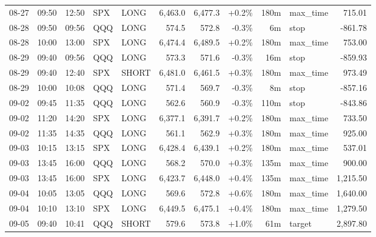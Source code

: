 \documentclass[11pt,a4paper,twoside]{article}
\begin{document}
\begin{center}
\begin{longtable}{>{\color{txtmain}}l l l l l r r r r >{\color{txtmain}}l r}
08-27 & 09:50 & 12:50 & SPX & LONG & 6,463.0 & 6,477.3 & \textcolor{wingreen}{+0.2\%} & 180m & max\_time & \textcolor{wingreen}{715.01} \\
08-28 & 09:50 & 09:56 & QQQ & LONG & 574.5 & 572.8 & \textcolor{lossred}{-0.3\%} & 6m & stop & \textcolor{lossred}{-861.78} \\
08-28 & 10:00 & 13:00 & SPX & LONG & 6,474.4 & 6,489.5 & \textcolor{wingreen}{+0.2\%} & 180m & max\_time & \textcolor{wingreen}{753.00} \\
08-29 & 09:40 & 09:56 & QQQ & LONG & 573.3 & 571.6 & \textcolor{lossred}{-0.3\%} & 16m & stop & \textcolor{lossred}{-859.93} \\
08-29 & 09:40 & 12:40 & SPX & SHORT & 6,481.0 & 6,461.5 & \textcolor{wingreen}{+0.3\%} & 180m & max\_time & \textcolor{wingreen}{973.49} \\
08-29 & 10:00 & 10:08 & QQQ & LONG & 571.4 & 569.7 & \textcolor{lossred}{-0.3\%} & 8m & stop & \textcolor{lossred}{-857.16} \\
09-02 & 09:45 & 11:35 & QQQ & LONG & 562.6 & 560.9 & \textcolor{lossred}{-0.3\%} & 110m & stop & \textcolor{lossred}{-843.86} \\
09-02 & 11:20 & 14:20 & SPX & LONG & 6,377.1 & 6,391.7 & \textcolor{wingreen}{+0.2\%} & 180m & max\_time & \textcolor{wingreen}{733.50} \\
09-02 & 11:35 & 14:35 & QQQ & LONG & 561.1 & 562.9 & \textcolor{wingreen}{+0.3\%} & 180m & max\_time & \textcolor{wingreen}{925.00} \\
09-03 & 10:15 & 13:15 & SPX & LONG & 6,428.4 & 6,439.1 & \textcolor{wingreen}{+0.2\%} & 180m & max\_time & \textcolor{wingreen}{537.01} \\
09-03 & 13:45 & 16:00 & QQQ & LONG & 568.2 & 570.0 & \textcolor{wingreen}{+0.3\%} & 135m & max\_time & \textcolor{wingreen}{900.00} \\
09-03 & 13:45 & 16:00 & SPX & LONG & 6,423.7 & 6,448.0 & \textcolor{wingreen}{+0.4\%} & 135m & max\_time & \textcolor{wingreen}{1,215.50} \\
09-04 & 10:05 & 13:05 & QQQ & LONG & 569.6 & 572.8 & \textcolor{wingreen}{+0.6\%} & 180m & max\_time & \textcolor{wingreen}{1,640.00} \\
09-04 & 10:10 & 13:10 & SPX & LONG & 6,449.5 & 6,475.1 & \textcolor{wingreen}{+0.4\%} & 180m & max\_time & \textcolor{wingreen}{1,279.50} \\
09-05 & 09:40 & 10:41 & QQQ & SHORT & 579.6 & 573.8 & \textcolor{wingreen}{+1.0\%} & 61m & target & \textcolor{wingreen}{2,897.80} \\

\end{longtable}
\end{center}
\end{document}
